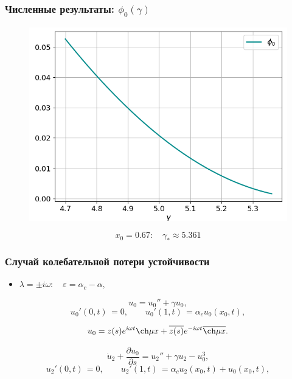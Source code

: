 \documentclass[fullscreen=true, unicode, bookmarks=false]{beamer}
\begin{document}
\begin{frame}
\frametitle{ Численные результаты: $ \phi_0(\gamma) $ }

\begin{figure} 
\includegraphics[scale=0.55]{divergent_phi0_23.png}  
\end{figure}

$$ x_0 = 0.67: \quad \gamma_* \approx 5.361 $$

\end{frame}

\begin{frame}
\frametitle{ Случай колебательной потери устойчивости }

\begin{itemize}
\item { $ \lambda = \pm i \omega: \quad \varepsilon=\alpha_c-\alpha, $
}
\end{itemize}

\medskip
\pause

\begin{equation}
	u_0 = u_0'' + \gamma u_0,
\end{equation}
\begin{equation}
	u_0'(0, t) \, = 0, \qquad u_0'(1, t) \, = \alpha_c u_0(x_0, t),
\end{equation}

$$ u_0 = z(s) e^{i \omega t} \ch \mu x + \overline{z(s)} e^{-i \omega t} \overline{\ch \mu x}. $$

\medskip

\begin{equation}
	\dot u_2 + \frac{\partial u_0}{\partial s} = u_2'' + \gamma u_2 - u_0^3,
\end{equation}
\begin{equation}
	u_2'(0, t) \, = 0, \qquad u_2'(1, t) \, = \alpha_c u_2(x_0, t) + u_0(x_0, t),
\end{equation}


\end{frame}
\end{document}
